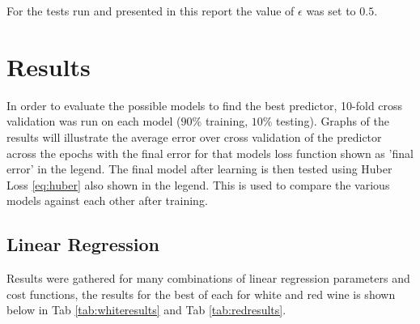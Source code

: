 \documentclass[10pt,twocolumn,letterpaper]{article}
\begin{document}
For the tests run and presented in this report the value of $\epsilon$ was set to $0.5$.

\section{Results}
In order to evaluate the possible models to find the best predictor, 10-fold cross validation was run on each model ($90\%$ training, $10\%$ testing). Graphs of the results will illustrate the average error over cross validation of the predictor across the epochs with the final error for that models loss function shown as 'final error' in the legend. 
The final model after learning is then tested using Huber Loss \ref{eq:huber} also shown in the legend. This is used to compare the various models against each other after training.

\subsection{Linear Regression}
Results were gathered for many combinations of linear regression parameters and cost functions, the results for the best of each for white and red wine is shown below in Tab \ref{tab:whiteresults} and Tab \ref{tab:redresults}.
\end{document}
